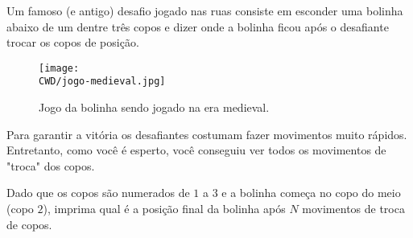 %

Um famoso (e antigo) desafio jogado nas ruas consiste em esconder uma bolinha abaixo de um dentre três copos e dizer onde a bolinha ficou após o desafiante trocar os copos de posição.

\begin{figure}[H]
  \centering
  \texttt{[image: \\CWD/jogo-medieval.jpg]}
  \caption{Jogo da bolinha sendo jogado na era medieval.}
\end{figure}

Para garantir a vitória os desafiantes costumam fazer movimentos muito rápidos. Entretanto, como você é esperto, você conseguiu ver todos os movimentos de "troca" dos copos. 

Dado que os copos são numerados de $1$ a $3$ e a bolinha começa no copo do meio (copo $2$), imprima qual é a posição final da bolinha após $N$ movimentos de troca de copos.

%
%

%
%



\sampleio
